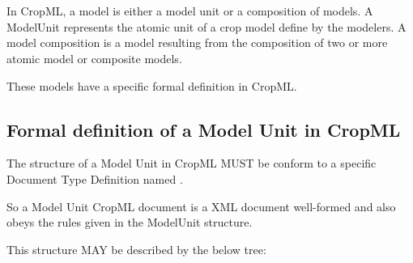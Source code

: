 \documentclass[letterpaper,13pt,english]{sphinxmanual}
\begin{document}
\chapter{}
\label{\detokenize{user/description:cropml-description}}\label{\detokenize{user/description::doc}}
\begin{DUlineblock}{0em}
\item[] In CropML, a model is either a model unit or a composition of models. A ModelUnit  represents the atomic unit of a crop model define by the
modelers. A model composition  is a model resulting from the composition of two or more atomic model or composite models.
\item[] These models have a specific formal definition in CropML.
\end{DUlineblock}


\section{Formal definition of a Model Unit in CropML}
\label{\detokenize{user/description:formal-definition-of-a-model-unit-in-cropml}}
\begin{DUlineblock}{0em}
\item[] The structure of a Model Unit in CropML MUST be conform to a specific Document Type Definition
named  .
\item[] So a Model Unit CropML document is a XML document well-formed and also obeys the rules given in the ModelUnit structure.
\item[] This structure MAY be described by the below tree:
\end{DUlineblock}

\noindent{}
\end{document}
